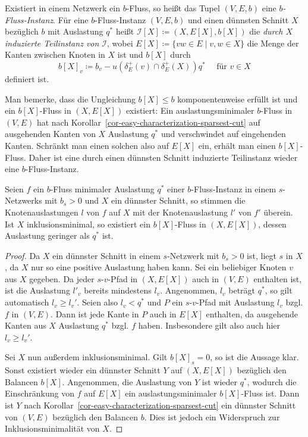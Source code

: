 \begin{definition}
	Existiert in einem Netzwerk ein $b$-Fluss, so heißt das Tupel $(V, E, b)$ eine \emph{$b$-Fluss-Instanz}.
	Für eine $b$-Fluss-Instanz $(V, E, b)$ und einen dünnsten Schnitt $X$ bezüglich $b$ mit Auslastung $q^*$ heißt $\mathcal{I}[X] \coloneq (X, E[X], b[X])$ die \emph{durch $X$ induzierte Teilinstanz von $\mathcal{I}$},
	wobei $E[X] \coloneq \{ vw \in E \mid v, w \in X \}$ die Menge der Kanten zwischen Knoten in $X$ ist und $b[X]$ durch \[
	b[X]_v \coloneq b_v - u(\delta^+_E(v)\cap\delta^+_E(X)) q^* \text{~~~ für $v\in X$}
\] definiert ist.
\end{definition}

Man bemerke, dass die Ungleichung $b[X] \leq b$ komponentenweise erfüllt ist und ein $b[X]$-Fluss in $(X, E[X])$ existiert:
Ein auslastungsminimaler $b$-Fluss in $(V, E)$ hat nach Korollar~\ref{cor-easy-characterization-sparsest-cut} auf ausgehenden Kanten von $X$ Auslastung $q^*$ und verschwindet auf eingehenden Kanten.
Schränkt man einen solchen also auf $E[X]$ ein, erhält man einen $b[X]$-Fluss.
Daher ist eine durch einen dünnsten Schnitt induzierte Teilinstanz wieder eine  $b$-Fluss-Instanz.

\begin{proposition}\label{prop-restricted-minimal-flow-is-b-flow-on-induced-instance}
	Seien $f$ ein $b$-Fluss minimaler Auslastung $q^*$ einer $b$-Fluss-Instanz in einem $s$-Netzwerks mit $b_s > 0$ und $X$ ein dünnster Schnitt, so stimmen die Knotenauslastungen $l$ von $f$ auf $X$ mit der Knotenauslastung $l'$ von $f'$ überein.
	Ist $X$ inklusionsminimal, so existiert ein $b[X]$-Fluss in $(X, E[X])$, dessen Auslastung geringer als $q^*$ ist.
\end{proposition}
\begin{proof}
	Da $X$ ein dünnster Schnitt in einem $s$-Netzwerk mit $b_s > 0$ ist, liegt $s$ in $X$, da $X$ nur so eine positive Auslastung haben kann.
	Sei ein beliebiger Knoten $v$ aus $X$ gegeben.
	Da jeder $s$-$v$-Pfad in $(X, E[X])$ auch in $(V, E)$ enthalten ist, ist die Auslastung $l'_v$ bereits mindestens $l_v$.
	Angenommen, $l_v$ beträgt $q^*$, so gilt automatisch $l_v \geq l_v'$.
	Seien also $l_v < q^*$ und $P$ ein $s$-$v$-Pfad mit Auslastung $l_v$ bzgl. $f$ in $(V, E)$.
	Dann ist jede Kante in $P$ auch in $E[X]$ enthalten, da ausgehende Kanten aus $X$ Auslastung $q^*$ bzgl. $f$ haben.
	Insbesondere gilt also auch hier $l_v \geq l_v'$.
	
	Sei $X$ nun außerdem inklusionsminimal.
	Gilt $b[X]_s = 0$, so ist die Aussage klar.
	Sonst existiert wieder ein dünnster Schnitt $Y$ auf $(X, E[X])$ bezüglich den Balancen $b[X]$.
	Angenommen, die Auslastung von $Y$ ist wieder $q^*$, wodurch die Einschränkung von $f$ auf $E[X]$ ein auslastungsminimaler $b[X]$-Fluss ist.
	Dann ist $Y$ nach Korollar~\ref{cor-easy-characterization-sparsest-cut} ein dünnster Schnitt von $(V, E)$ bezüglich den Balancen $b$.
	Dies ist jedoch ein Widerspruch zur Inklusionsminimalität von $X$.
\end{proof}

